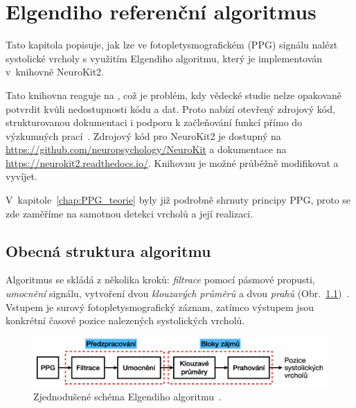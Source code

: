 \chapter{Elgendiho referenční algoritmus}
\label{chap:elgendi_neurokit}
Tato kapitola popisuje, jak lze ve fotopletysmografickém (\acs{PPG}) signálu nalézt systolické vrcholy s využitím Elgendiho algoritmu, který je implementován v~knihovně NeuroKit2.

Tato knihovna reaguje na , což je problém, kdy vědecké studie nelze opakovaně potvrdit kvůli nedostupnosti kódu a dat.
Proto nabízí otevřený zdrojový kód, strukturovanou dokumentaci i podporu k začleňování funkcí přímo do výzkumných prací~\cite{NeuroKit2}.
Zdrojový kód pro NeuroKit2 je dostupný na \url{https://github.com/neuropsychology/NeuroKit} a dokumentace na \url{https://neurokit2.readthedocs.io/}.
Knihovnu je možné průběžně modifikovat a vyvíjet.

V~kapitole~\ref{chap:PPG_teorie} byly již podrobně shrnuty principy \acs{PPG}, proto se zde zaměříme na samotnou detekci vrcholů a její realizaci.

\section{Obecná struktura algoritmu}
\label{sec:alg_structure}
Algoritmus se skládá z několika kroků: \emph{filtrace} pomocí pásmové propusti, \emph{umocnění} signálu, vytvoření dvou \emph{klouzavých průměrů} a dvou \emph{prahů} (Obr.~\ref{fig:alg-scheme})~\cite{Elgendi2013}.
Vstupem je surový fotopletysmografický záznam, zatímco výstupem jsou konkrétní časové pozice nalezených systolických vrcholů.

\begin{figure}[h]
	\centering
	\includegraphics[width=1\textwidth]{./obrazky/ElgendiBlokSchema.png}
	\vspace{-5mm}
	\caption[Struktura Elgendiho algoritmu]{Zjednodušené schéma Elgendiho algoritmu~\cite{Elgendi2013}.}
	\vspace{-5mm}
	\label{fig:alg-scheme}
\end{figure}

